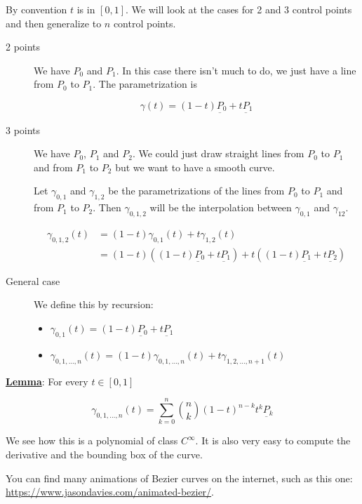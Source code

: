 \documentclass[10pt]{extarticle}
\renewcommand{\vec}[1]{\underbar{\ensuremath{#1}}}
\begin{document}
By convention $t$ is in $[0, 1]$. We will look at the cases for 2 and 3 control points and then generalize to $n$ control points.

\begin{description}
    \item[2 points] We have $P_0$ and $P_1$.
        In this case there isn't much to do, we just have a line from $P_0$ to $P_1$. The parametrization is

        $$
            \gamma(t) = (1 - t) \vec{P_0} + t \vec{P_1}
        $$

    \item[3 points] We have $P_0$, $P_1$ and $P_2$.
        We could just draw straight lines from $P_0$ to $P_1$ and from $P_1$ to $P_2$ but we want to have a smooth curve.

        Let $\gamma_{0,1}$ and $\gamma_{1,2}$ be the parametrizations of the lines from $P_0$ to $P_1$ and from $P_1$ to $P_2$.
        Then $\gamma_{0,1,2}$ will be the interpolation between $\gamma_{0,1}$ and $\gamma_{12}$.

        \begin{align*}
            \gamma_{0,1,2}(t) & = (1 - t) \gamma_{0,1}(t) + t \gamma_{1,2}(t)                                                           \\
                              & = (1 - t) \left((1 - t) \vec{P_0} + t \vec{P_1}\right) + t \left((1 - t) \vec{P_1} + t \vec{P_2}\right)
        \end{align*}

    \item[General case] We define this by recursion:
        \begin{itemize}
            \item $\gamma_{0,1}(t) = (1 - t) \vec{P_0} + t \vec{P_1}$
            \item $\gamma_{0,1, \ldots, n}(t) = (1 - t) \gamma_{0,1, \ldots, n}(t) + t \gamma_{1,2, \ldots, n+1}(t)$
        \end{itemize}
\end{description}

\textbf{\underline{Lemma}}:
For every $t \in [0, 1]$

$$
    \gamma_{0,1, \ldots, n}(t) = \sum_{k=0}^n \binom{n}{k} (1 - t)^{n-k} t^k \vec{P_k}
$$

We see how this is a polynomial of class $C^\infty$. It is also very easy to compute the derivative and the bounding box of the curve.

You can find many animations of Bezier curves on the internet, such as this one: \url{https://www.jasondavies.com/animated-bezier/}.
\end{document}
